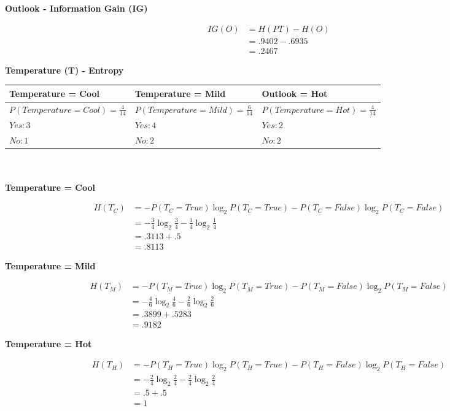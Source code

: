 \documentclass[11pt]{article}
\begin{document}
\begin{enumerate}
\textbf{Outlook - Information Gain (IG)}

\[
\begin{aligned}
IG(O)&= H(PT) - H(O)\\[5pt]
&= .9402 - .6935\\[5pt]
&= .2467
\end{aligned}
\]

\textbf{Temperature (T) - Entropy}

\begin{tabular}{l|l|l}
    \textbf{Temperature = Cool} & \textbf{Temperature = Mild} & \textbf{Outlook = Hot} \\
    \hline
    $P(Temperature = Cool) = \frac{4}{14}$ & $P(Temperature = Mild) = \frac{6}{14}$ & $P(Temperature = Hot) = \frac{4}{14}$ \\
    $Yes: 3$ & $Yes: 4$ & $Yes: 2$ \\
    $No: 1$ & $No: 2$ & $No: 2$ \\
\end{tabular}\\\\

\textbf{Temperature = Cool}

\[
\begin{aligned}
H(T_C)&= -P(T_C=True) \log_2 P(T_C=True)-P(T_C=False) \log_2 P(T_C=False)\\[5pt]
&= -\frac{3}{4}\log_2\frac{3}{4}-\frac{1}{4}\log_2\frac{1}{4}\\[5pt]
&= .3113 + .5\\[5pt]
&= .8113
\end{aligned}
\]

\textbf{Temperature = Mild}

\[
\begin{aligned}
H(T_M)&= -P(T_M=True) \log_2 P(T_M=True)-P(T_M=False) \log_2 P(T_M=False)\\[5pt]
&= -\frac{4}{6}\log_2\frac{4}{6}-\frac{2}{6}\log_2\frac{2}{6}\\[5pt]
&= .3899 + .5283\\[5pt]
&= .9182
\end{aligned}
\]

\textbf{Temperature = Hot}

\[
\begin{aligned}
H(T_H)&= -P(T_H=True) \log_2 P(T_H=True)-P(T_H=False) \log_2 P(T_H=False)\\[5pt]
&= -\frac{2}{4}\log_2\frac{2}{4}-\frac{2}{4}\log_2\frac{2}{4}\\[5pt]
&= .5 + .5\\[5pt]
&= 1
\end{aligned}
\]


\end{enumerate}
\end{document}
